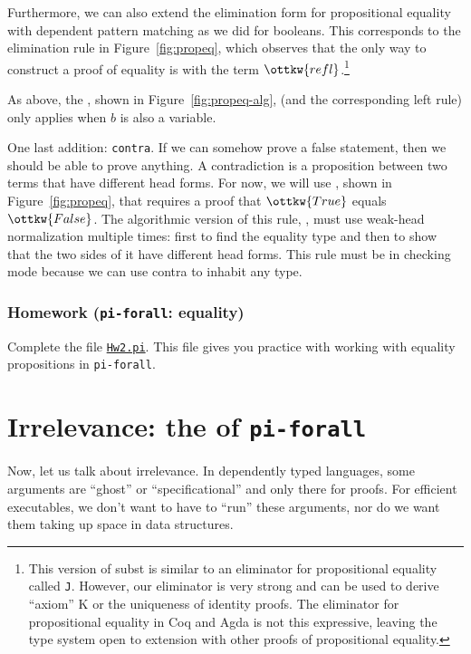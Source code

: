 \documentclass{article}
\def\({}%
\def\){}%
\newcommand\pif{\texttt{pi-forall}\xspace}
\theoremstyle{definition}
\begin{document}
Furthermore, we can also extend the elimination form for propositional
equality with dependent pattern matching as we did for booleans. This
corresponds to the elimination rule  in Figure~\ref{fig:propeq},
which observes that the only way to construct a proof of equality is with the
term $\ottkw{refl}$.\footnote{This version of subst is similar to an eliminator
  for propositional equality called \texttt{J}. However, our
  eliminator is very strong and can be used to derive ``axiom'' K or the
  uniqueness of identity proofs. The eliminator for propositional equality in
  Coq and Agda is not this expressive, leaving the type system open to
  extension with other proofs of propositional equality. }

As above, the , shown in Figure~\ref{fig:propeq-alg}, (and
the corresponding left rule) only applies when $b$ is also a variable.

One last addition: \texttt{contra}. If we can somehow prove a false statement,
then we should be able to prove anything. A contradiction is a proposition
between two terms that have different head forms. For now, we will use
, shown in Figure~\ref{fig:propeq}, that requires a proof that
$\ottkw{True}$ equals $\ottkw{False}$. The algorithmic version of this rule,
, must use weak-head normalization multiple times: first to
find the equality type and then to show that the two sides of it have
different head forms. This rule must be in checking mode because we can use
\textsf{contra} to inhabit any type.

\subsubsection{Homework (\pif: equality)}

Complete the file \href{version2/test/Hw2.pi}{\texttt{Hw2.pi}}. This file
gives you practice with working with equality propositions in \pif.

\section{Irrelevance: the \(\forall\) of \pif}
\label{sec:irrelevance}

Now, let us talk about irrelevance. In dependently typed languages, some
arguments are ``ghost'' or ``specificational'' and only there for proofs. For
efficient executables, we don't want to have to ``run'' these arguments, nor
do we want them taking up space in data structures.
\end{document}
